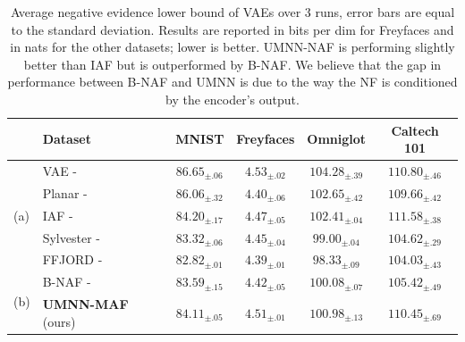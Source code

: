\begin{table}
\caption{Average negative evidence lower bound of VAEs over 3 runs, error bars are equal to the standard deviation.
    Results are reported in bits per dim for Freyfaces and in nats for the other datasets; lower is better. UMNN-NAF is performing slightly better than IAF but is outperformed by B-NAF. We believe that the gap in performance between B-NAF and UMNN is due to the way the NF is conditioned by the encoder's output.}    \label{tab:vae_results}
    \centering
    \scriptsize
    \setlength{\tabcolsep}{1pt}
    \renewcommand{\arraystretch}{1.5}
    \begin{tabular}{l l c c c c}
        \hline
        &Dataset &
        \textbf{MNIST} & \textbf{Freyfaces} &\textbf{Omniglot} & \textbf{Caltech 101} \\
        \hline
        \multirow{5}{*}{(a)}
        & VAE - \cite{VAE} & $86.65_{\pm.06}$ & $4.53_{\pm.02}$ & $104.28_{\pm.39}$ & $110.80_{\pm.46}$ \\
        & Planar - \cite{NF} & $86.06_{\pm.32}$ & $4.40_{\pm.06}$ & $102.65_{\pm.42}$ & $109.66_{\pm.42}$\\
        & IAF - \cite{kingma_improved_2016}& $84.20_{\pm.17}$ & $4.47_{\pm.05}$ & $102.41_{\pm.04}$ & $111.58_{\pm.38}$\\
        & Sylvester - \cite{SylvesterFlow}& $83.32_{\pm.06}$ & $4.45_{\pm.04}$ & $99.00_{\pm.04}$ &
        $104.62_{\pm.29}$\\
        & FFJORD - \cite{grathwohl_ffjord_2018}& $82.82_{\pm.01}$ & $4.39_{\pm.01}$ & $98.33_{\pm.09}$ & $104.03_{\pm.43}$\\ \hline
        \multirow{2}{*}{(b)}
        & B-NAF - \cite{de_cao_block_2020}& $83.59_{\pm.15}$ & $4.42_{\pm.05}$ & $100.08_{\pm.07}$ & $105.42_{\pm.49}$\\
        & \textbf{UMNN-MAF} (ours)
        & $84.11_{\pm .05}$  %
        & $4.51_{\pm .01}$   %
        & $100.98_{\pm .13}$ %
        & $110.45_{\pm .69}$ %
        \\ \hline
    \end{tabular}


\end{table}
